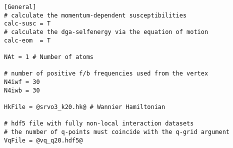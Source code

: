 \documentclass[a4paper,11pt]{article}
\numberwithin{equation}{section} %
\begin{document}
\newpage
\begin{lstlisting}[caption=example abinitiodga config file, frame=single, basicstyle=\small, style=base2]
[General]                                                                                                                                                                                                      
# calculate the momentum-dependent susceptibilities
calc-susc = T                                                                                                                                                                                                  
# calculate the dga-selfenergy via the equation of motion
calc-eom  = T                                                                                                                                                                                                
                                                                                                                                                                                                             
NAt = 1 # Number of atoms                                                                                                                                                                                                                                                                                                                                                                                                      

# number of positive f/b frequencies used from the vertex                                                                                                                                                                                                               
N4iwf = 30
N4iwb = 30
                                                                                                                                                                                                               
HkFile = @srvo3_k20.hk@ # Wannier Hamiltonian                                                                                                                                                                                        

# hdf5 file with fully non-local interaction datasets                                                                                                                                                                                                                                                                                                                                                                                                                
# the number of q-points must coincide with the q-grid argument
VqFile = @vq_q20.hdf5@ 
                                                                                                                                                                                                                                                                                                                                                                                                               

\end{lstlisting}
\end{document}
